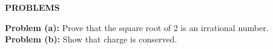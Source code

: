 \documentclass{report}
\begin{document}
\begin{center}
    {\bfseries \LARGE PROBLEMS}
\end{center}
\begin{flushleft}
    {\bfseries \LARGE Problem (a):} {\Large Prove that the square root of 2 is an irrational number.}\\
    {\bfseries \LARGE Problem (b):} {\Large Show that charge is conserved.}
\end{flushleft}
\end{document}
